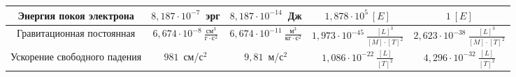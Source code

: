 \begin{table}[h!]
\begin{tabular}{|*{5}{C{.18}|}}
        Энергия покоя электрона & \( 8,\!187 \cdot 10^{-7} \)~эрг &
          \( 8,\!187 \cdot 10^{-14} \)~Дж & \( 1,\!878 \cdot 10^5~[E] \) &
          \( 1~[E] \) \\ \hline
        Гравитационная постоянная & \( 6,\!674 \cdot 10^{-8}~\frac{\text{см}^3}
          {\text{г} \cdot \text{с}^2} \) &
          \( 6,\!674 \cdot 10^{-11}~\frac{\text{м}^3}
          {\text{кг} \cdot \text{с}^2} \) &
          \( 1,\!973 \cdot 10^{-45}~\frac{[L]^3}{[M] \cdot [T]^2} \) &
          \( 2,\!623 \cdot 10^{-38}~\frac{[L]^3}{[M] \cdot [T]^2} \) \\ \hline
        Ускорение свободного падения & \( 981 \)~см/с\(^2\) &
          \( 9,\!81 \)~м/с\(^2\) &
          \( 1,\!086 \cdot 10^{-22}~\frac{[L]}{[T]^2} \) &
          \( 4,\!296 \cdot 10^{-32}~\frac{[L]}{[T]^2} \) \\ \hline
    \end{tabular}
  \end{table}
